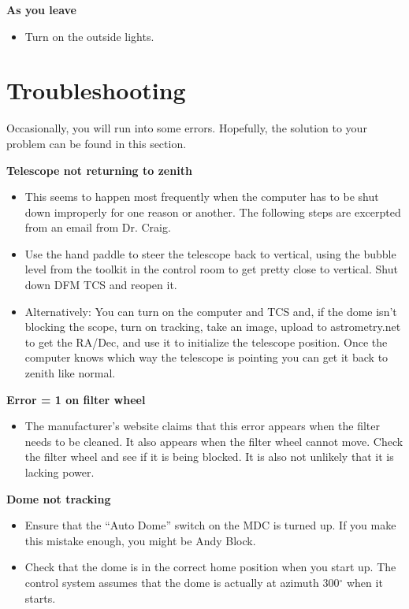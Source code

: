 \documentclass[letterpaper, 12pt]{report}
\begin{document}
\noindent
\large \textbf{As you leave}
\begin{itemize}
	\item Turn on the outside lights.
\end{itemize}

\newpage
\chapter{Troubleshooting}
Occasionally, you will run into some errors. Hopefully, the solution to your problem can be found in this section.

\noindent\textbf{Telescope not returning to zenith}
\begin{itemize}
	\item This seems to happen most frequently when the computer has to be shut down improperly for one reason or another. The following steps are excerpted from an email from Dr. Craig.
	\item Use the hand paddle to steer the telescope back to vertical, using the bubble level from the toolkit in the control room to get pretty close to vertical. Shut down DFM TCS and reopen it.
	\item Alternatively: You can turn on the computer and TCS and, if the dome isn’t blocking the scope, turn on tracking, take an image, upload to astrometry.net to get the RA/Dec, and use it to initialize the telescope position. Once the computer knows which way the telescope is pointing you can get it back to zenith like normal.
\end{itemize}

\noindent\textbf{Error = 1 on filter wheel}
\begin{itemize}
	\item The manufacturer's website claims that this error appears when the filter needs to be cleaned. It also appears when the filter wheel cannot move. Check the filter wheel and see if it is being blocked. It is also not unlikely that it is lacking power.
\end{itemize}

\noindent \textbf{Dome not tracking}
\begin{itemize}
	\item Ensure that the ``Auto Dome'' switch on the MDC is turned up. If you make this mistake enough, you might be Andy Block.
	\item Check that the dome is in the correct home position when you start up. The control system assumes that the dome is actually at azimuth 300$^\circ$ when it starts.
\end{itemize}
\end{document}
